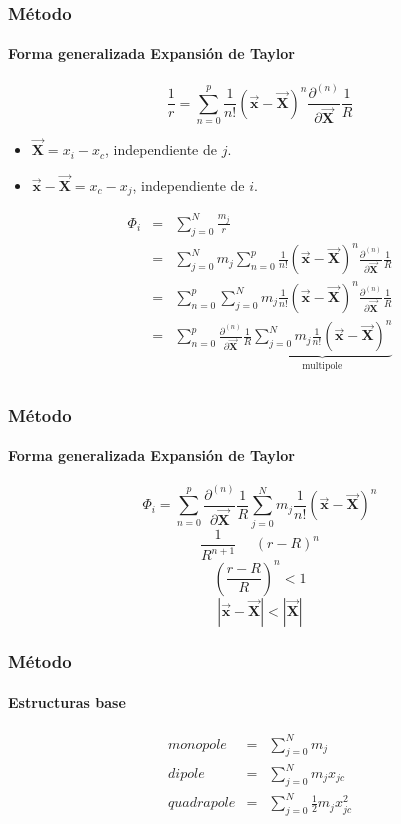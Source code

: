 \begin{frame}
    \frametitle{Método}
    \framesubtitle{Forma generalizada Expansión de Taylor}
    \footnotesize
    $$\frac{1}{r} = \sum_{n=0}^{p} \frac{1}{n!} (\vec{\mathbf{x}}-\vec{\mathbf{X}})^{n}\frac{\partial^{(n)}}{\partial \vec{\mathbf{X}}} \frac{1}{R}$$
    \begin{itemize}
        \item $\vec{\mathbf{X}} = x_{i} - x_{c}$, independiente de $j$.
        \item $\vec{\mathbf{x}} - \vec{\mathbf{X}} = x_{c} - x_{j}$, independiente de $i$. 
    \end{itemize}
    \tiny
    \begin{eqnarray}
        \Phi_{i} &=& \sum_{j=0}^{N} \frac{m_{j}}{r} \nonumber \\
                 &=& \sum_{j=0}^{N} m_{j}\sum_{n=0}^{p} \frac{1}{n!}(\vec{\mathbf{x}}-\vec{\mathbf{X}})^{n}\frac{\partial^{(n)}}{\partial \vec{\mathbf{X}}} \frac{1}{R} \nonumber \\
                 &=& \sum_{n=0}^{p} \sum_{j=0}^{N} m_{j}\frac{1}{n!}(\vec{\mathbf{x}}-\vec{\mathbf{X}})^{n}\frac{\partial^{(n)}}{\partial \vec{\mathbf{X}}} \frac{1}{R} \nonumber \\
                 &=& \sum_{n=0}^{p} \frac{\partial^{(n)}}{\partial \vec{\mathbf{X}}} \frac{1}{R} \underbrace{\sum_{j=0}^{N} m_{j}\frac{1}{n!}(\vec{\mathbf{x}}-\vec{\mathbf{X}})^{n}}_{\mbox{multipole}} \nonumber \\
    \end{eqnarray}
\end{frame}

\begin{frame}
    \frametitle{Método}
    \framesubtitle{Forma generalizada Expansión de Taylor}

    $$\Phi_{i} = \sum_{n=0}^{p} \frac{\partial^{(n)}}{\partial \vec{\mathbf{X}}} \frac{1}{R} \sum_{j=0}^{N} m_{j}\frac{1}{n!}(\vec{\mathbf{x}}-\vec{\mathbf{X}})^{n} $$
    $$\frac{1}{R^{n+1}}\ \ \ \ \ \ (r-R)^{n}$$
    $$\left(\frac{r-R}{R}\right)^{n} < 1$$
    $$ |\vec{\mathbf{x}} - \vec{\mathbf{X}}| < |\vec{\mathbf{X}}|$$
    
\end{frame}


\begin{frame}
    \frametitle{Método}
    \framesubtitle{Estructuras base}

    \begin{eqnarray}
        monopole &=& \sum_{j=0}^{N} m_{j} \nonumber \\
        dipole  &=& \sum_{j=0}^{N} m_{j} x_{jc} \nonumber \\
        quadrapole   &=& \sum_{j=0}^{N} \frac{1}{2} m_{j} x^{2}_{jc} \nonumber 
    \end{eqnarray}

\end{frame}
